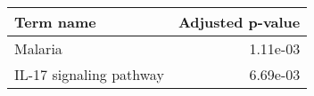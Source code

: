 \begin{tabular}{lr}
\toprule
              Term name &  Adjusted p-value \\
\midrule
                Malaria &          1.11e-03 \\
IL-17 signaling pathway &          6.69e-03 \\
\bottomrule
\end{tabular}
